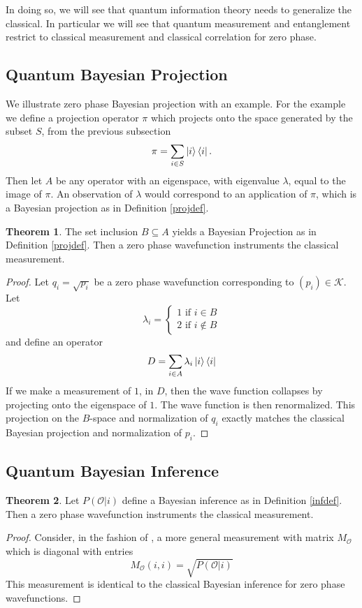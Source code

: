 \documentclass[12pt,a4paper]{article}
\theoremstyle{myrule}
\theoremstyle{postulate}
\theoremstyle{definition}
\newtheorem{theorem}{Theorem}[section]
\begin{document}
In doing so, we will see that quantum information theory needs to generalize the classical.  In particular we will see that quantum measurement and entanglement restrict to classical measurement and classical correlation for zero phase.

\subsection{Quantum Bayesian Projection}
We illustrate zero phase Bayesian projection with an example.  For the example we define a projection operator $\pi$ which projects onto the space generated by the subset $S$, from the previous subsection
\[
\pi = \sum_{i \in S} \ket{i} \bra{i}.
\]
Then let $A$ be any operator with an eigenspace, with eigenvalue $\lambda$, equal to the image of $\pi$.  An observation of $\lambda$ would correspond to an application of $\pi$, which is a Bayesian projection as in Definition \ref{projdef}.
\begin{theorem}
  The set inclusion $B \subseteq A$ yields a Bayesian Projection as in Definition \ref{projdef}.  Then a zero phase wavefunction instruments the classical measurement.
\end{theorem}
\begin{proof}
Let $q_i = \sqrt{p_i}$ be a zero phase wavefunction corresponding to $(p_i) \in \mathcal{K}$.  Let
  \[
  \lambda_i = \left\{ \begin{array}{ll} 1 \text{ if } i \in B \\ 2 \text{ if } i \not \in B \end{array} \right.
  \]
and define an operator
\[
  D = \sum_{i \in A} \lambda_i \ket{i} \bra{i}
\]
If we make a measurement of $1$, in $D$, then the wave function collapses by projecting onto the eigenspace of $1$. The wave function is then renormalized.  This projection on the $B$-space and normalization of $q_i$ exactly matches the classical Bayesian projection and normalization of $p_i$.
\end{proof}
\subsection{Quantum Bayesian Inference}
\begin{theorem}
  Let $P(\mathcal{O} | i)$ define a Bayesian inference as in Definition \ref{infdef}.  Then a zero phase wavefunction instruments the classical measurement.
\end{theorem}
\begin{proof}
Consider, in the fashion of \cite{nielsenchuang}, a more general measurement with matrix $M_\mathcal{O}$ which is diagonal with entries
\[
   M_\mathcal{O}(i,i) = \sqrt{P(\mathcal{O} | i)}
\]
This measurement is identical to the classical Bayesian inference for zero phase wavefunctions.
\end{proof}
\end{document}
